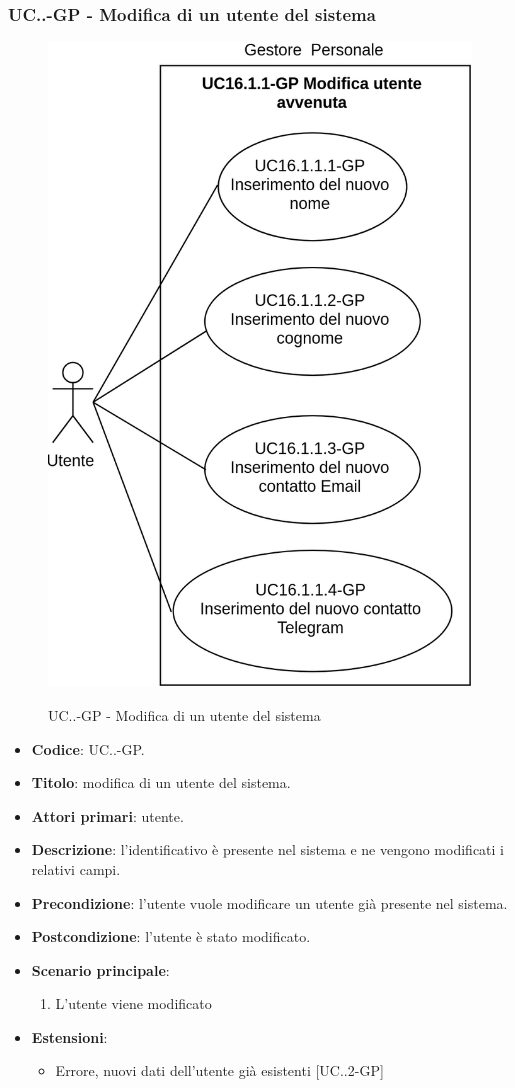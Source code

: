 		\subsubsection{UC\theuccount.\thesubuccount.\thesubsubuccount-GP - Modifica di un utente del sistema}
			\begin{figure}[H]
				\centering
				\includegraphics[width=0.6\columnwidth]{img/casi_d'uso/UC16_1_1.png}\\
				\caption{UC\theuccount.\thesubuccount.\thesubsubuccount-GP - Modifica di un utente del sistema}
			\end{figure}
			\begin{itemize}
				\item \textbf{Codice}: UC\theuccount.\thesubuccount.\thesubsubuccount-GP.
				\item \textbf{Titolo}: modifica di un utente del sistema.
				\item \textbf{Attori primari}: utente.
				\item \textbf{Descrizione}: l'identificativo è presente nel sistema e ne vengono modificati i relativi campi.
				\item \textbf{Precondizione}: l'utente vuole modificare un utente già presente nel sistema.
				\item \textbf{Postcondizione}: l'utente è stato modificato.
				\item \textbf{Scenario principale}:
				\begin{enumerate}
					\item L'utente viene modificato
				\end{enumerate}
				\item \textbf{Estensioni}:
				\begin{itemize}
					\item Errore, nuovi dati dell'utente già esistenti [UC\theuccount.\thesubuccount.2-GP]
				\end{itemize}
			\end{itemize}
			

